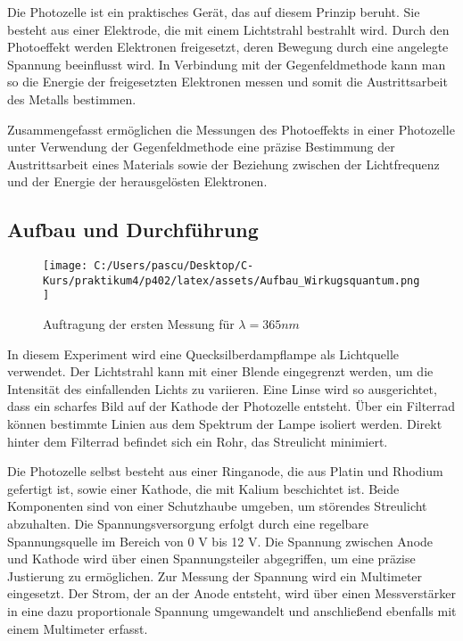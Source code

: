\documentclass{article}
\begin{document}
Die Photozelle ist ein praktisches Gerät, das auf diesem Prinzip beruht. Sie besteht aus einer 
Elektrode, die mit einem Lichtstrahl bestrahlt wird. Durch den Photoeffekt werden Elektronen 
freigesetzt, deren Bewegung durch eine angelegte Spannung beeinflusst wird. In Verbindung mit 
der Gegenfeldmethode kann man so die Energie der freigesetzten Elektronen messen und somit die 
Austrittsarbeit des Metalls bestimmen.

Zusammengefasst ermöglichen die Messungen des Photoeffekts in einer Photozelle unter 
Verwendung der Gegenfeldmethode eine präzise Bestimmung der Austrittsarbeit eines Materials 
sowie der Beziehung zwischen der Lichtfrequenz und der Energie der herausgelösten Elektronen.

    
\clearpage
\subsection{Aufbau und Durchführung}
\begin{figure}[h!]
  \centering
  \texttt{[image: C:/Users/pascu/Desktop/C-Kurs/praktikum4/p402/latex/assets/Aufbau\_Wirkugsquantum.png]}
  \caption{Auftragung der ersten Messung für $ \lambda =365nm$}
  \label{fig:aufbau_wirkungs}
\end{figure}

In diesem Experiment wird eine Quecksilberdampflampe als Lichtquelle verwendet. Der Lichtstrahl
 kann mit einer Blende eingegrenzt werden, um die Intensität des einfallenden Lichts zu variieren. Eine Linse wird so ausgerichtet, dass ein scharfes Bild auf der Kathode der Photozelle entsteht. Über ein Filterrad können bestimmte Linien aus dem Spektrum der Lampe isoliert werden. Direkt hinter dem Filterrad befindet sich ein Rohr, das Streulicht minimiert.

Die Photozelle selbst besteht aus einer Ringanode, die aus Platin und Rhodium gefertigt 
ist, sowie einer Kathode, die mit Kalium beschichtet ist. Beide Komponenten sind von einer 
Schutzhaube umgeben, um störendes Streulicht abzuhalten. Die Spannungsversorgung erfolgt 
durch eine regelbare Spannungsquelle im Bereich von 0 V bis 12 V. Die Spannung zwischen 
Anode und Kathode wird über einen Spannungsteiler abgegriffen, um eine präzise Justierung 
zu ermöglichen. Zur Messung der Spannung wird ein Multimeter eingesetzt. Der Strom, der 
an der Anode entsteht, wird über einen Messverstärker in eine dazu proportionale Spannung 
umgewandelt und anschließend ebenfalls mit einem Multimeter erfasst.
\end{document}
